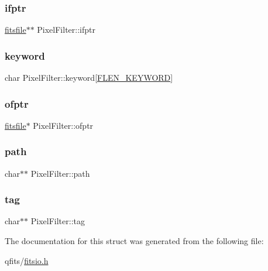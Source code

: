 \mbox{\label{struct_pixel_filter_aac89ff8afdab01de175221df31c2065c}} 
\subsubsection{\texorpdfstring{ifptr}{ifptr}}
{\footnotesize\ttfamily \hyperlink{structfitsfile}{fitsfile}$\ast$$\ast$ Pixel\+Filter\+::ifptr}

\mbox{\label{struct_pixel_filter_a55f192f2304f0a25e0c2bbdcb1cb68be}} 
\subsubsection{\texorpdfstring{keyword}{keyword}}
{\footnotesize\ttfamily char Pixel\+Filter\+::keyword\mbox{[}\hyperlink{fitsio_8h_aa5a1b2fd338bc483b8d17d5a55bebf0f}{F\+L\+E\+N\+\_\+\+K\+E\+Y\+W\+O\+RD}\mbox{]}}

\mbox{\label{struct_pixel_filter_ac5bd6de199aef2c93f36b37099ce5e96}} 
\subsubsection{\texorpdfstring{ofptr}{ofptr}}
{\footnotesize\ttfamily \hyperlink{structfitsfile}{fitsfile}$\ast$ Pixel\+Filter\+::ofptr}

\mbox{\label{struct_pixel_filter_abe91d3da0379f2f5c3e4b723451e9a3c}} 
\subsubsection{\texorpdfstring{path}{path}}
{\footnotesize\ttfamily char$\ast$$\ast$ Pixel\+Filter\+::path}

\mbox{\label{struct_pixel_filter_a71b96f3e8b70a5fefeca1fa33a2bf716}} 
\subsubsection{\texorpdfstring{tag}{tag}}
{\footnotesize\ttfamily char$\ast$$\ast$ Pixel\+Filter\+::tag}



The documentation for this struct was generated from the following file\+:\begin{DoxyCompactItemize}
\item 
qfits/\hyperlink{fitsio_8h}{fitsio.\+h}\end{DoxyCompactItemize}
